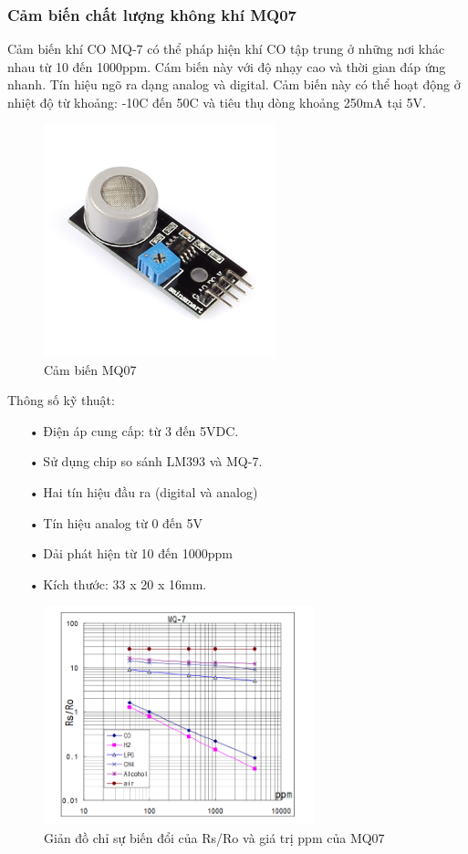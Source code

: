 \subsubsection*{Cảm biến chất lượng không khí MQ07} 
Cảm biến khí CO MQ-7 có thể pháp hiện khí CO tập trung ở những nơi khác nhau từ 10 đến 1000ppm. Cám biến này với độ nhạy cao và thời gian đáp ứng nhanh. Tín hiệu ngõ ra dạng analog và digital. Cảm biến này có thể hoạt động ở nhiệt độ từ khoảng: -10C đến 50C và tiêu thụ dòng khoảng 250mA tại 5V.
\begin{figure}[H]
\centering    
\includegraphics[width=0.6\textwidth]{mq07}
\caption[Cảm biến MQ07]{Cảm biến MQ07}
\label{fig:mq07}
\end{figure}
Thông số kỹ thuật:
\begin{itemize}
\item[•]Điện áp cung cấp: từ 3 đến 5VDC.
\item[•]Sử dụng chip so sánh LM393 và MQ-7.
\item[•]Hai tín hiệu đầu ra (digital và analog)
\item[•]Tín hiệu analog từ 0 đến 5V 
\item[•]Dải phát hiện từ 10 đến 1000ppm
\item[•]Kích thước: 33 x 20 x 16mm.
\end{itemize}
\begin{figure}[H]
\centering    
\includegraphics[width=0.7\textwidth]{mq07_mqh1}
\caption[Giản đồ chỉ sự biến đổi của Rs/Ro và giá trị ppm của MQ07]{Giản đồ chỉ sự biến đổi của Rs/Ro và giá trị ppm của MQ07}
\label{fig:mq07_mqh1}
\end{figure}


